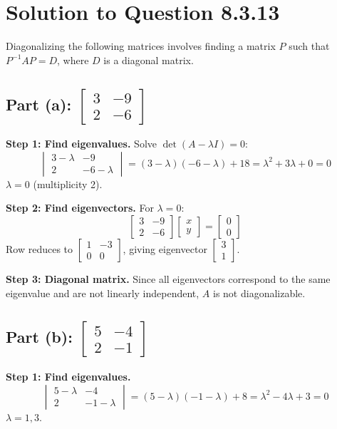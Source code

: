 \documentclass[12pt]{article}
\begin{document}
\section*{Solution to Question 8.3.13}
Diagonalizing the following matrices involves finding a matrix \(P\) such that \(P^{-1}AP = D\), where \(D\) is a diagonal matrix.

\subsection*{Part (a): \( \begin{bmatrix} 3 & -9 \\ 2 & -6 \end{bmatrix} \)}
\textbf{Step 1: Find eigenvalues.} Solve \(\det(A - \lambda I) = 0\):
\[
\begin{vmatrix}
3 - \lambda & -9 \\
2 & -6 - \lambda
\end{vmatrix} = (3 - \lambda)(-6 - \lambda) + 18 = \lambda^2 + 3\lambda + 0 = 0
\]
\(\lambda = 0\) (multiplicity 2).

\textbf{Step 2: Find eigenvectors.} For \(\lambda = 0\):
\[
\begin{bmatrix}
3 & -9 \\
2 & -6
\end{bmatrix} \begin{bmatrix} x \\ y \end{bmatrix} = \begin{bmatrix} 0 \\ 0 \end{bmatrix}
\]
Row reduces to \(\begin{bmatrix} 1 & -3 \\ 0 & 0 \end{bmatrix}\), giving eigenvector \(\begin{bmatrix} 3 \\ 1 \end{bmatrix}\).

\textbf{Step 3: Diagonal matrix.} Since all eigenvectors correspond to the same eigenvalue and are not linearly independent, \(A\) is not diagonalizable.

\subsection*{Part (b): \( \begin{bmatrix} 5 & -4 \\ 2 & -1 \end{bmatrix} \)}
\textbf{Step 1: Find eigenvalues.}
\[
\begin{vmatrix}
5 - \lambda & -4 \\
2 & -1 - \lambda
\end{vmatrix} = (5 - \lambda)(-1 - \lambda) + 8 = \lambda^2 - 4\lambda + 3 = 0
\]
\(\lambda = 1, 3\).
\end{document}
